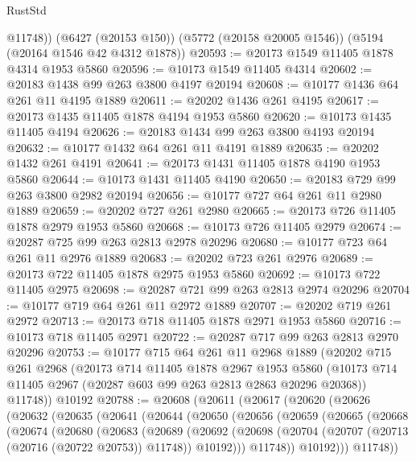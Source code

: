 \begin{lexlean}{RustStd}
\begin{coremodule}
        @11748))
    (@6427 (@20153 @150))
    (@5772 (@20158 @20005 @1546))
    (@5194 (@20164 @1546 @42 @4312 @1878))
@20593 := @20173 @1549 @11405 @1878 @4314 @1953 @5860
@20596 := @10173 @1549 @11405 @4314
@20602 := @20183 @1438 @99 @263 @3800 @4197 @20194
@20608 := @10177 @1436 @64 @261 @11 @4195 @1889
@20611 := @20202 @1436 @261 @4195
@20617 := @20173 @1435 @11405 @1878 @4194 @1953 @5860
@20620 := @10173 @1435 @11405 @4194
@20626 := @20183 @1434 @99 @263 @3800 @4193 @20194
@20632 := @10177 @1432 @64 @261 @11 @4191 @1889
@20635 := @20202 @1432 @261 @4191
@20641 := @20173 @1431 @11405 @1878 @4190 @1953 @5860
@20644 := @10173 @1431 @11405 @4190
@20650 := @20183 @729 @99 @263 @3800 @2982 @20194
@20656 := @10177 @727 @64 @261 @11 @2980 @1889
@20659 := @20202 @727 @261 @2980
@20665 := @20173 @726 @11405 @1878 @2979 @1953 @5860
@20668 := @10173 @726 @11405 @2979
@20674 := @20287 @725 @99 @263 @2813 @2978 @20296
@20680 := @10177 @723 @64 @261 @11 @2976 @1889
@20683 := @20202 @723 @261 @2976
@20689 := @20173 @722 @11405 @1878 @2975 @1953 @5860
@20692 := @10173 @722 @11405 @2975
@20698 := @20287 @721 @99 @263 @2813 @2974 @20296
@20704 := @10177 @719 @64 @261 @11 @2972 @1889
@20707 := @20202 @719 @261 @2972
@20713 := @20173 @718 @11405 @1878 @2971 @1953 @5860
@20716 := @10173 @718 @11405 @2971
@20722 := @20287 @717 @99 @263 @2813 @2970 @20296
@20753 := @10177
    @715
    @64
    @261
    @11
    @2968
    @1889
    (@20202
      @715
      @261
      @2968
      (@20173
        @714
        @11405
        @1878
        @2967
        @1953
        @5860
        (@10173 @714 @11405 @2967 (@20287 @603 @99 @263 @2813 @2863 @20296 @20368))
        @11748))
    @10192
@20788 := @20608
    (@20611
      (@20617
        (@20620
          (@20626
            (@20632
              (@20635
                (@20641
                  (@20644
                    (@20650
                      (@20656
                        (@20659
                          (@20665
                            (@20668
                              (@20674
                                (@20680
                                  (@20683
                                    (@20689
                                      (@20692
                                        (@20698
                                          (@20704
                                            (@20707 (@20713 (@20716 (@20722 @20753)) @11748))
                                            @10192)))
                                      @11748))
                                  @10192)))
                            @11748))

\end{coremodule}
\end{lexlean}
